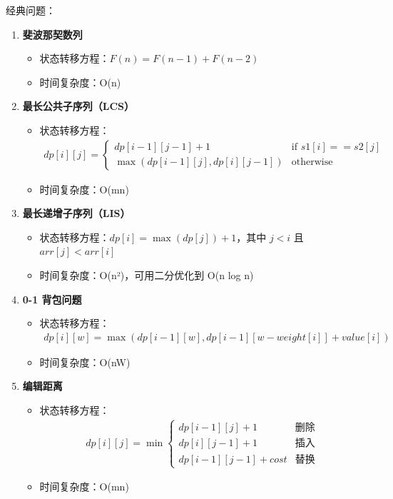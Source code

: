 经典问题：
\begin{enumerate}
  \item \textbf{斐波那契数列}
    \begin{itemize}
      \item 状态转移方程：$F(n) = F(n-1) + F(n-2)$
      \item 时间复杂度：O(n)
    \end{itemize}

  \item \textbf{最长公共子序列（LCS）}
    \begin{itemize}
      \item 状态转移方程：
      \begin{align*}
        dp[i][j] = \begin{cases}
          dp[i-1][j-1] + 1 & \text{if } s1[i] == s2[j] \\
          \max(dp[i-1][j], dp[i][j-1]) & \text{otherwise}
        \end{cases}
      \end{align*}
      \item 时间复杂度：O(mn)
    \end{itemize}

  \item \textbf{最长递增子序列（LIS）}
    \begin{itemize}
      \item 状态转移方程：$dp[i] = \max(dp[j]) + 1$，其中 $j < i$ 且 $arr[j] < arr[i]$
      \item 时间复杂度：O(n²)，可用二分优化到 O(n log n)
    \end{itemize}

  \item \textbf{0-1 背包问题}
    \begin{itemize}
      \item 状态转移方程：
      \begin{align*}
        dp[i][w] = \max(dp[i-1][w], dp[i-1][w-weight[i]] + value[i])
      \end{align*}
      \item 时间复杂度：O(nW)
    \end{itemize}

  \item \textbf{编辑距离}
    \begin{itemize}
      \item 状态转移方程：
      \begin{align*}
        dp[i][j] = \min\begin{cases}
          dp[i-1][j] + 1 & \text{删除} \\
          dp[i][j-1] + 1 & \text{插入} \\
          dp[i-1][j-1] + cost & \text{替换}
        \end{cases}
      \end{align*}
      \item 时间复杂度：O(mn)
    \end{itemize}


\end{enumerate}
